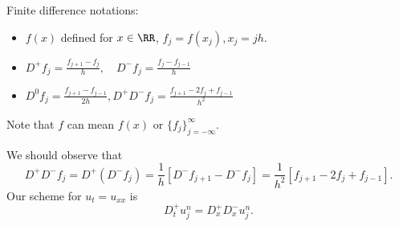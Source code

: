 \begin{definition}
\label{def: Finite difference}
Finite difference notations: 

\begin{itemize}
    \item $f(x)$ defined for $x\in \RR$, $f_j = f(x_j), x_j = jh$. 
    \item $D^+ f_j = \frac{f_{ j+1 } -f_j }{h}, \quad D^- f_j = \frac{f_j - f_{j-1}}{h}$ 
    \item $ D^0 f_j = \frac{f_{j+1}- f_{j-1}}{2h}, D^+D^- f_j = \frac{f_{j+1} - 2f_j + f_{j-1}}{h^2} $ 
\end{itemize}
Note that $f$ can mean $f(x)$ or $ \{f_j\}_{j=-\infty}^\infty $.  
\end{definition}

We should observe that 
\[
    D^+ D^- f_j = D^+ (D^-f_j) = \frac{1}{h}\left[ D^- f_{j+1} - D^- f_j \right]  = \frac{1}{h^2}[f_{j+1} -2f_j + f_{j-1}]. 
\]
Our scheme for $u_t = u_{xx}$ is 
\[
    D_t^+ u_j^n = D_x^+ D_x^- u_j^n. 
\]


